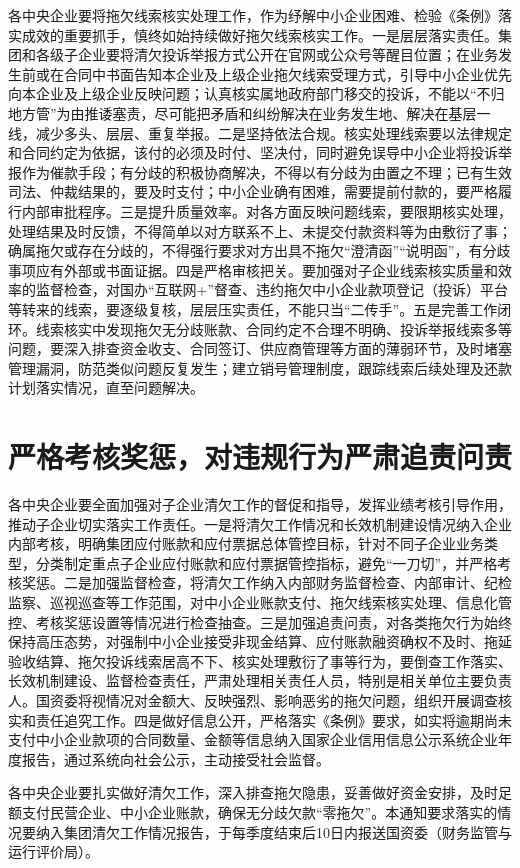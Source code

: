 各中央企业要将拖欠线索核实处理工作，作为纾解中小企业困难、检验《条例》落实成效的重要抓手，慎终如始持续做好拖欠线索核实工作。一是层层落实责任。集团和各级子企业要将清欠投诉举报方式公开在官网或公众号等醒目位置；在业务发生前或在合同中书面告知本企业及上级企业拖欠线索受理方式，引导中小企业优先向本企业及上级企业反映问题；认真核实属地政府部门移交的投诉，不能以“不归地方管”为由推诿塞责，尽可能把矛盾和纠纷解决在业务发生地、解决在基层一线，减少多头、层层、重复举报。二是坚持依法合规。核实处理线索要以法律规定和合同约定为依据，该付的必须及时付、坚决付，同时避免误导中小企业将投诉举报作为催款手段；有分歧的积极协商解决，不得以有分歧为由置之不理；已有生效司法、仲裁结果的，要及时支付；中小企业确有困难，需要提前付款的，要严格履行内部审批程序。三是提升质量效率。对各方面反映问题线索，要限期核实处理，处理结果及时反馈，不得简单以对方联系不上、未提交付款资料等为由敷衍了事；确属拖欠或存在分歧的，不得强行要求对方出具不拖欠“澄清函”“说明函”，有分歧事项应有外部或书面证据。四是严格审核把关。要加强对子企业线索核实质量和效率的监督检查，对国办“互联网+”督查、违约拖欠中小企业款项登记（投诉）平台等转来的线索，要逐级复核，层层压实责任，不能只当“二传手”。五是完善工作闭环。线索核实中发现拖欠无分歧账款、合同约定不合理不明确、投诉举报线索多等问题，要深入排查资金收支、合同签订、供应商管理等方面的薄弱环节，及时堵塞管理漏洞，防范类似问题反复发生；建立销号管理制度，跟踪线索后续处理及还款计划落实情况，直至问题解决。

\section{严格考核奖惩，对违规行为严肃追责问责}

各中央企业要全面加强对子企业清欠工作的督促和指导，发挥业绩考核引导作用，推动子企业切实落实工作责任。一是将清欠工作情况和长效机制建设情况纳入企业内部考核，明确集团应付账款和应付票据总体管控目标，针对不同子企业业务类型，分类制定重点子企业应付账款和应付票据管控指标，避免“一刀切”，并严格考核奖惩。二是加强监督检查，将清欠工作纳入内部财务监督检查、内部审计、纪检监察、巡视巡查等工作范围，对中小企业账款支付、拖欠线索核实处理、信息化管控、考核奖惩设置等情况进行检查抽查。三是加强追责问责，对各类拖欠行为始终保持高压态势，对强制中小企业接受非现金结算、应付账款融资确权不及时、拖延验收结算、拖欠投诉线索居高不下、核实处理敷衍了事等行为，要倒查工作落实、长效机制建设、监督检查责任，严肃处理相关责任人员，特别是相关单位主要负责人。国资委将视情况对金额大、反映强烈、影响恶劣的拖欠问题，组织开展调查核实和责任追究工作。四是做好信息公开，严格落实《条例》要求，如实将逾期尚未支付中小企业款项的合同数量、金额等信息纳入国家企业信用信息公示系统企业年度报告，通过系统向社会公示，主动接受社会监督。

各中央企业要扎实做好清欠工作，深入排查拖欠隐患，妥善做好资金安排，及时足额支付民营企业、中小企业账款，确保无分歧欠款“零拖欠”。本通知要求落实的情况要纳入集团清欠工作情况报告，于每季度结束后10日内报送国资委（财务监管与运行评价局）。

~\\


